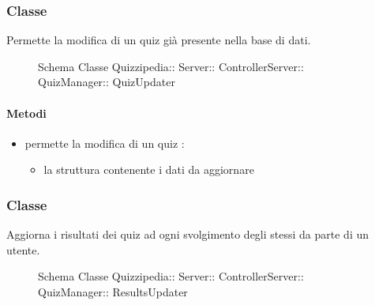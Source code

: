\subsubsection{Classe }
Permette la modifica di un quiz già presente nella base di dati.
\begin{figure}[H]
\centering
\noindent{}
\caption[Schema Classe QuizUpdater]{Schema Classe Quizzipedia:: Server:: ControllerServer:: QuizManager:: QuizUpdater}
\end{figure}
\paragraph{Metodi}
\begin{itemize}
\item {}
\newline
permette la modifica di un quiz
\newline
{} :
\begin{itemize}
\item {}
\newline
la struttura contenente i dati da aggiornare
\end{itemize}
\end{itemize}
\subsubsection{Classe }
Aggiorna i risultati dei quiz ad ogni svolgimento degli stessi da parte di un utente.
\begin{figure}[H]
\centering
\noindent{}
\caption[Schema Classe ResultsUpdater]{Schema Classe Quizzipedia:: Server:: ControllerServer:: QuizManager:: ResultsUpdater}
\end{figure}
